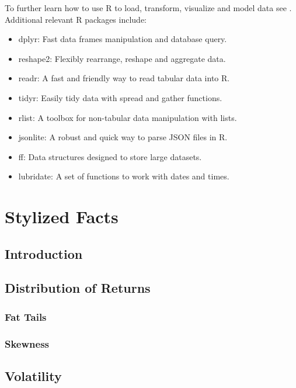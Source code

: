 \documentclass[]{book}
\providecommand{\tightlist}{%
  \setlength{\itemsep}{0pt}\setlength{\parskip}{0pt}}
\theoremstyle{definition}
\theoremstyle{definition}
\theoremstyle{definition}
\theoremstyle{remark}
\begin{document}
To further learn how to use R to load, transform, visualize and model
data see \citep{Wickham:2017:RDS:3086927}. Additional relevant R
packages include:

\begin{itemize}
\tightlist
\item
  dplyr: Fast data frames manipulation and database query.
\item
  reshape2: Flexibly rearrange, reshape and aggregate data.
\item
  readr: A fast and friendly way to read tabular data into R.
\item
  tidyr: Easily tidy data with spread and gather functions.
\item
  rlist: A toolbox for non-tabular data manipulation with lists.
\item
  jsonlite: A robust and quick way to parse JSON files in R.
\item
  ff: Data structures designed to store large datasets.
\item
  lubridate: A set of functions to work with dates and times.
\end{itemize}

\chapter{Stylized Facts}\label{stylized-facts}

\section{Introduction}\label{introduction}

\section{Distribution of Returns}\label{distribution-of-returns}

\subsection{Fat Tails}\label{fat-tails}

\subsection{Skewness}\label{skewness}

\section{Volatility}\label{volatility}
\end{document}
